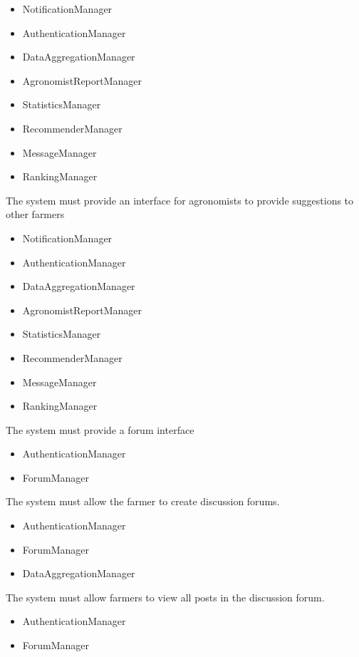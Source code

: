 \begin{itemize}
\begin{itemize}
\item NotificationManager
\item AuthenticationManager
\item DataAggregationManager
\item AgronomistReportManager
\item StatisticsManager
\item RecommenderManager
\item MessageManager
\item RankingManager

\end{itemize}
 The system must provide an interface for agronomists to provide suggestions to other farmers
\begin{itemize}

\item NotificationManager
\item AuthenticationManager
\item DataAggregationManager
\item AgronomistReportManager
\item StatisticsManager
\item RecommenderManager
\item MessageManager
\item RankingManager

\end{itemize}
  The system must provide a forum interface
\begin{itemize}

\item AuthenticationManager
\item ForumManager


\end{itemize}

  The system must allow the farmer to create discussion forums.

\begin{itemize}

\item AuthenticationManager
\item ForumManager
\item DataAggregationManager


\end{itemize}

  The system must allow farmers to view all posts in the discussion forum.
\begin{itemize}

\item AuthenticationManager
\item ForumManager



\end{itemize}
\end{itemize}
